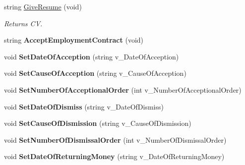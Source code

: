 \begin{DoxyCompactItemize}
\mbox{\label{class_employee_a37e77828f9f559a27951e3113b3fb520}} 
string \hyperlink{class_employee_a37e77828f9f559a27951e3113b3fb520}{Give\+Resume} (void)
\begin{DoxyCompactList}\small\item\em Returns CV. \end{DoxyCompactList}\item 
\mbox{\label{class_employee_ad7a5d34564702bc8b880db1714c75413}} 
string {\bfseries Accept\+Employment\+Contract} (void)
\item 
\mbox{\label{class_employee_a62cc0f19d969528e061ad178a1b109ac}} 
void {\bfseries Set\+Date\+Of\+Acception} (string v\+\_\+\+Date\+Of\+Acception)
\item 
\mbox{\label{class_employee_a7eebc60f8cfd43fe07fae6196a317b0c}} 
void {\bfseries Set\+Cause\+Of\+Acception} (string v\+\_\+\+Cause\+Of\+Acception)
\item 
\mbox{\label{class_employee_ae0a2d5a5ec36af567bc7e434d18de422}} 
void {\bfseries Set\+Number\+Of\+Acceptional\+Order} (int v\+\_\+\+Number\+Of\+Acceptional\+Order)
\item 
\mbox{\label{class_employee_acbb98daeb702b22d616c8b7064784210}} 
void {\bfseries Set\+Date\+Of\+Dismiss} (string v\+\_\+\+Date\+Of\+Dismiss)
\item 
\mbox{\label{class_employee_ac129a41d2cb756360ad056bf39c25464}} 
void {\bfseries Set\+Cause\+Of\+Dismission} (string v\+\_\+\+Cause\+Of\+Dismission)
\item 
\mbox{\label{class_employee_abcf46d071f43b17f0a83b00a327822b9}} 
void {\bfseries Set\+Number\+Of\+Dismissal\+Order} (int v\+\_\+\+Number\+Of\+Dismissal\+Order)
\item 
\mbox{\label{class_employee_a3ffb3c8c2dc4817f88801be832eb8caa}} 
void {\bfseries Set\+Date\+Of\+Returning\+Money} (string v\+\_\+\+Date\+Of\+Returning\+Money)
\item 
\mbox{\label{class_employee_ad8df9b482bc23365e06357005524c5fd}} 

\end{DoxyCompactItemize}
